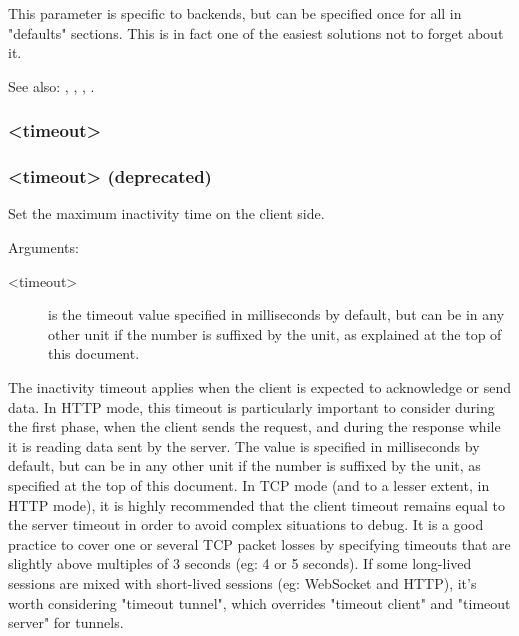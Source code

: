   This parameter is specific to backends, but can be specified once for all in
  "defaults" sections. This is in fact one of the easiest solutions not to
  forget about it.


See also: , , ,
            .

\subsubsection[timeout client]{ <timeout>}
\subsubsection[timeout clitimeout]{ <timeout> (deprecated)}


  Set the maximum inactivity time on the client side.


  Arguments:
  \begin{description}
  \item[<timeout>] is the timeout value specified in milliseconds by default, but
              can be in any other unit if the number is suffixed by the unit,
              as explained at the top of this document.
  \end{description}

  The inactivity timeout applies when the client is expected to acknowledge or
  send data. In HTTP mode, this timeout is particularly important to consider
  during the first phase, when the client sends the request, and during the
  response while it is reading data sent by the server. The value is specified
  in milliseconds by default, but can be in any other unit if the number is
  suffixed by the unit, as specified at the top of this document. In TCP mode
  (and to a lesser extent, in HTTP mode), it is highly recommended that the
  client timeout remains equal to the server timeout in order to avoid complex
  situations to debug. It is a good practice to cover one or several TCP packet
  losses by specifying timeouts that are slightly above multiples of 3 seconds
  (eg: 4 or 5 seconds). If some long-lived sessions are mixed with short-lived
  sessions (eg: WebSocket and HTTP), it's worth considering "timeout tunnel",
  which overrides "timeout client" and "timeout server" for tunnels.

